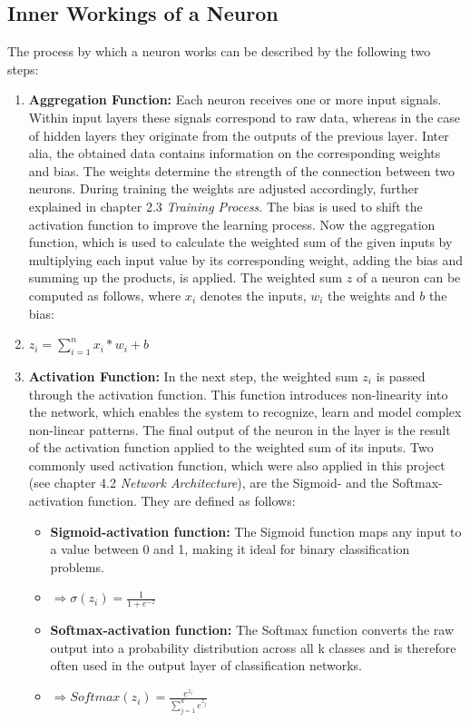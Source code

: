 \documentclass[12pt,fleqn,a4paper]{article}
\begin{document}
\subsection{Inner Workings of a Neuron}
The process by which a neuron works can be described by the following two steps:
 \begin{enumerate}
 \item \textbf{Aggregation Function:} Each neuron receives one or more input signals. Within input layers these signals correspond to raw data, whereas in the case of hidden layers they originate from the outputs of the previous layer. Inter alia, the obtained data contains information on the corresponding weights and bias. The weights determine the strength of the connection between two neurons. During training the weights are adjusted accordingly, further explained in chapter 2.3 \textit{Training Process}. The bias is used to shift the activation function to improve the learning process. 
Now the aggregation function, which is used to calculate the weighted sum of the given inputs by multiplying each input value by its corresponding weight, adding the bias and summing up the products, is applied. The weighted sum $z$ of a neuron can be computed as follows, where $x_i$ denotes the inputs, $w_i$ the weights and $b$ the bias: \\
\item[]\vspace{-0.5cm}\hspace{2cm}$z_i = \sum_{i=1}^n x_i* w_i +b$

 \item \textbf{Activation Function:} In the next step, the weighted sum $z_i$ is passed through the activation function. This function introduces non-linearity into the network, which enables the system to recognize, learn and model complex non-linear patterns. The final output of the neuron in the layer is the result of the activation function applied to the weighted sum of its inputs. Two commonly used activation function, which were also applied in this project (see chapter 4.2 \textit{Network Architecture}), are the Sigmoid- and the Softmax-activation function. They are defined as follows:
\begin{itemize}
\item \textbf{Sigmoid-activation function:} The Sigmoid function maps any input to a value between 0 and 1, making it ideal for binary classification problems. 
\item[]\hspace{1.25cm}$\Rightarrow \sigma(z_i)=\frac{1}{1+e^{-z}}$

\item \textbf{Softmax-activation function:} The Softmax function converts the raw output into a probability distribution across all k classes and is therefore often used in the output layer of classification networks.
\item[]\hspace{1.25cm}$\Rightarrow Softmax(z_i)=\frac{e^{z_i}}{\sum_{j=1}^{k} e^{z_j}}$
\end{itemize}
\end{enumerate}
\end{document}
